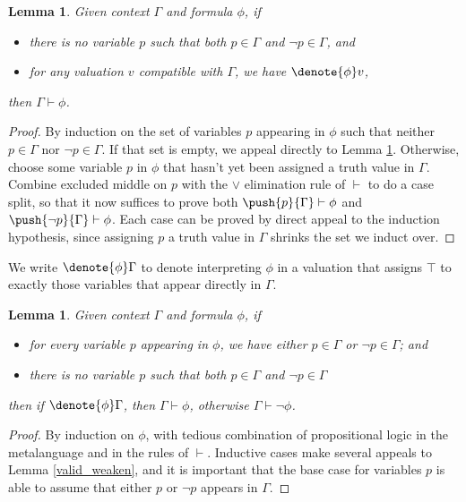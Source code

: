 \documentclass{amsbook}
\newtheorem{lemma}[theorem]{Lemma}
\theoremstyle{definition}
\theoremstyle{remark}
\numberwithin{section}{chapter}
\numberwithin{equation}{chapter}
\begin{document}
\begin{lemma}\label{interp_valid'}
  Given context $\Gamma$ and formula $\phi$, if
  \begin{itemize}
  \item there is no variable $p$ such that both $p \in \Gamma$ and $\neg p \in \Gamma$, and
  \item for any valuation $v$ compatible with $\Gamma$, we have $\denote{\phi}v$,
  \end{itemize}
  then $\Gamma \vdash \phi$.
\end{lemma}
\begin{proof}
  By induction on the set of variables $p$ appearing in $\phi$ such that neither $p \in \Gamma$ nor $\neg p \in \Gamma$.
  If that set is empty, we appeal directly to Lemma \ref{interp_valid''}.
  Otherwise, choose some variable $p$ in $\phi$ that hasn't yet been assigned a truth value in $\Gamma$.
  Combine excluded middle on $p$ with the $\lor$ elimination rule of $\vdash$ to do a case split, so that it now suffices to prove both $\push{p}{\Gamma} \vdash \phi$ and $\push{\neg p}{\Gamma} \vdash \phi$.
  Each case can be proved by direct appeal to the induction hypothesis, since assigning $p$ a truth value in $\Gamma$ shrinks the set we induct over.
\end{proof}

We write $\denote{\phi}\Gamma$ to denote interpreting $\phi$ in a valuation that assigns $\top$ to exactly those variables that appear directly in $\Gamma$.

\begin{lemma}\label{interp_valid''}
  Given context $\Gamma$ and formula $\phi$, if
  \begin{itemize}
  \item for every variable $p$ appearing in $\phi$, we have either $p \in \Gamma$ or $\neg p \in \Gamma$; and
  \item there is no variable $p$ such that both $p \in \Gamma$ and $\neg p \in \Gamma$
  \end{itemize}
  then if $\denote{\phi}\Gamma$, then $\Gamma \vdash \phi$, otherwise $\Gamma \vdash \neg \phi$.
\end{lemma}
\begin{proof}
  By induction on $\phi$, with tedious combination of propositional logic in the metalanguage and in the rules of $\vdash$.
  Inductive cases make several appeals to Lemma \ref{valid_weaken}, and it is important that the base case for variables $p$ is able to assume that either $p$ or $\neg p$ appears in $\Gamma$.
\end{proof}
\end{document}
